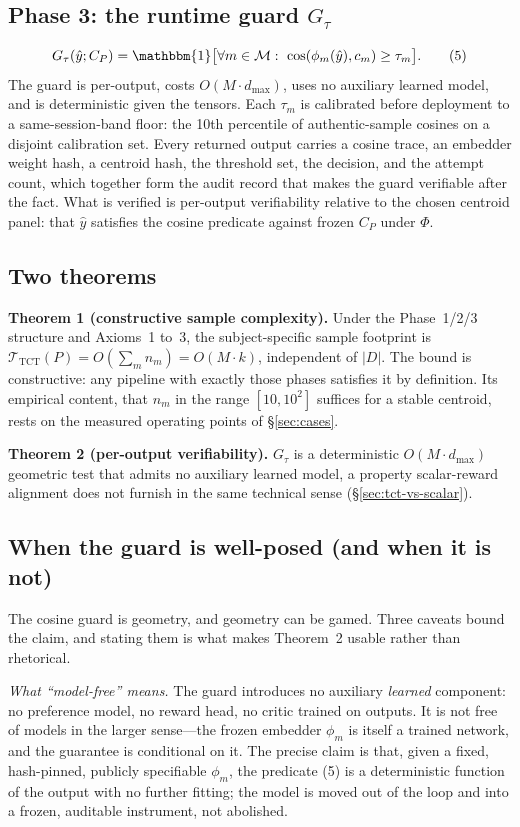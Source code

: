 \documentclass[10pt,twocolumn]{article}
\newcommand{\ind}{\mathbbm{1}}
\begin{document}
\subsection{Phase 3: the runtime guard $G_\tau$}
\begin{equation}
G_\tau(\hat y;C_P) = \ind\bigl[\forall m\in\mathcal{M}:\
\cos(\phi_m(\hat y),c_m)\ge\tau_m\bigr].\tag{5}
\end{equation}
The guard is per-output, costs $O(M\cdot d_{\max})$, uses no auxiliary learned
model, and is deterministic given the tensors. Each $\tau_m$ is calibrated before
deployment to a same-session-band floor: the 10th percentile of authentic-sample
cosines on a disjoint calibration set. Every returned output carries a cosine
trace, an embedder weight hash, a centroid hash, the threshold set, the decision,
and the attempt count, which together form the audit record that makes the guard
verifiable after the fact. What is verified is per-output verifiability relative
to the chosen centroid panel: that $\hat y$ satisfies the cosine predicate against
frozen $C_P$ under $\Phi$.

\subsection{Two theorems}
\textbf{Theorem 1 (constructive sample complexity).} Under the Phase~1/2/3
structure and Axioms~1 to~3, the subject-specific sample footprint is
$\mathcal{T}_{\mathrm{TCT}}(P)=O(\sum_m n_m)=O(M\cdot k)$, independent of $|D|$.
The bound is constructive: any pipeline with exactly those phases satisfies it by
definition. Its empirical content, that $n_m$ in the range $[10,10^2]$ suffices
for a stable centroid, rests on the measured operating points of
\S\ref{sec:cases}.

\textbf{Theorem 2 (per-output verifiability).} $G_\tau$ is a deterministic
$O(M\cdot d_{\max})$ geometric test that admits no auxiliary learned model, a
property scalar-reward alignment does not furnish in the same technical sense
(\S\ref{sec:tct-vs-scalar}).

\subsection{When the guard is well-posed (and when it is not)}
\label{sec:tct-honest}
The cosine guard is geometry, and geometry can be gamed. Three caveats bound the
claim, and stating them is what makes Theorem~2 usable rather than rhetorical.

\emph{What ``model-free'' means.} The guard introduces no auxiliary
\emph{learned} component: no preference model, no reward head, no critic trained
on outputs. It is not free of models in the larger sense---the frozen embedder
$\phi_m$ is itself a trained network, and the guarantee is conditional on it. The
precise claim is that, given a fixed, hash-pinned, publicly specifiable
$\phi_m$, the predicate (5) is a deterministic function of the output with no
further fitting; the model is moved out of the loop and into a frozen, auditable
instrument, not abolished.
\end{document}
